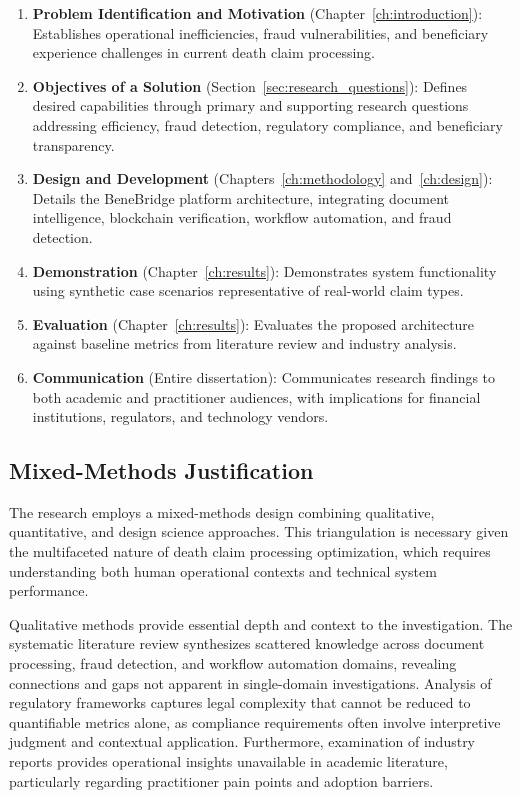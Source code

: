 \begin{enumerate}
\item \textbf{Problem Identification and Motivation} (Chapter~\ref{ch:introduction}): Establishes operational inefficiencies, fraud vulnerabilities, and beneficiary experience challenges in current death claim processing.

\item \textbf{Objectives of a Solution} (Section~\ref{sec:research_questions}): Defines desired capabilities through primary and supporting research questions addressing efficiency, fraud detection, regulatory compliance, and beneficiary transparency.

\item \textbf{Design and Development} (Chapters~\ref{ch:methodology} and~\ref{ch:design}): Details the BeneBridge platform architecture, integrating document intelligence, blockchain verification, workflow automation, and fraud detection.

\item \textbf{Demonstration} (Chapter~\ref{ch:results}): Demonstrates system functionality using synthetic case scenarios representative of real-world claim types.

\item \textbf{Evaluation} (Chapter~\ref{ch:results}): Evaluates the proposed architecture against baseline metrics from literature review and industry analysis.

\item \textbf{Communication} (Entire dissertation): Communicates research findings to both academic and practitioner audiences, with implications for financial institutions, regulators, and technology vendors.
\end{enumerate}

\subsection{Mixed-Methods Justification}

The research employs a mixed-methods design combining qualitative, quantitative, and design science approaches. This triangulation is necessary given the multifaceted nature of death claim processing optimization, which requires understanding both human operational contexts and technical system performance.

Qualitative methods provide essential depth and context to the investigation. The systematic literature review synthesizes scattered knowledge across document processing, fraud detection, and workflow automation domains, revealing connections and gaps not apparent in single-domain investigations. Analysis of regulatory frameworks captures legal complexity that cannot be reduced to quantifiable metrics alone, as compliance requirements often involve interpretive judgment and contextual application. Furthermore, examination of industry reports provides operational insights unavailable in academic literature, particularly regarding practitioner pain points and adoption barriers.


